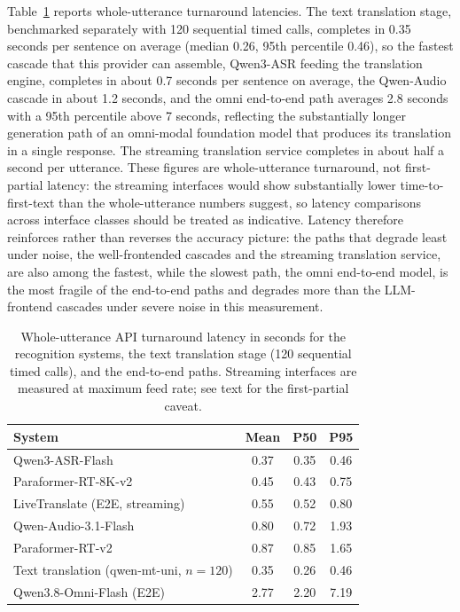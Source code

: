 Table~\ref{tab:latency} reports whole-utterance turnaround latencies. The
text translation stage, benchmarked separately with 120 sequential timed
calls, completes in 0.35 seconds per sentence on average (median 0.26, 95th
percentile 0.46), so the fastest cascade that this provider can assemble,
Qwen3-ASR feeding the translation engine, completes in about 0.7 seconds
per sentence on average, the Qwen-Audio cascade in about 1.2 seconds, and
the omni end-to-end path averages 2.8 seconds with a 95th percentile above
7 seconds, reflecting the substantially longer generation path of an
omni-modal foundation model that produces its translation in a single
response. The streaming translation service completes in about half a
second per utterance. These figures are whole-utterance turnaround, not
first-partial latency: the streaming interfaces would show substantially
lower time-to-first-text than the whole-utterance numbers suggest, so
latency comparisons across interface classes should be treated as
indicative. Latency therefore reinforces rather than reverses the accuracy
picture: the paths that degrade least under noise, the well-frontended
cascades and the streaming translation service, are also among the fastest,
while the slowest path, the omni end-to-end model, is the most fragile of
the end-to-end paths and degrades more than the LLM-frontend cascades
under severe noise in this measurement.

\begin{table}[t]
\centering
\caption{Whole-utterance API turnaround latency in seconds for the
recognition systems, the text translation stage (120 sequential timed
calls), and the end-to-end paths. Streaming interfaces are measured at
maximum feed rate; see text for the first-partial caveat.}
\label{tab:latency}
\small
\begin{tabular}{lccc}
\toprule
System & Mean & P50 & P95 \\
\midrule
Qwen3-ASR-Flash & 0.37 & 0.35 & 0.46 \\
Paraformer-RT-8K-v2 & 0.45 & 0.43 & 0.75 \\
LiveTranslate (E2E, streaming) & 0.55 & 0.52 & 0.80 \\
Qwen-Audio-3.1-Flash & 0.80 & 0.72 & 1.93 \\
Paraformer-RT-v2 & 0.87 & 0.85 & 1.65 \\
Text translation (qwen-mt-uni, $n{=}120$) & 0.35 & 0.26 & 0.46 \\
Qwen3.8-Omni-Flash (E2E) & 2.77 & 2.20 & 7.19 \\
\bottomrule
\end{tabular}
\end{table}

